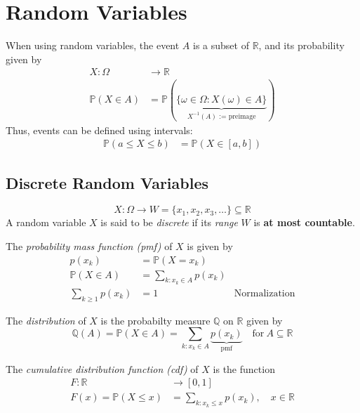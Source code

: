 \section{Random Variables}
When using random variables, the event $A$ is a subset of $\mathbb{R}$, and its probability given by
\noindent\begin{align*}
    X : \Omega         & \rightarrow \mathbb{R}                                                                      \\
    \mathbb{P}(X\in A) & =\mathbb{P}(\underbrace{\{\omega\in\Omega:X(\omega)\in A\}}_{X^{-1}(A)\text{ := preimage}})
\end{align*}
Thus, events can be defined using intervals:
\noindent\begin{align*}
    \mathbb{P}(a\leq X\leq b) & =\mathbb{P}(X\in[a,b])
\end{align*}

\subsection{Discrete Random Variables}
\noindent\begin{equation*}
    X:\Omega\rightarrow W=\{x_1,x_2,x_3,\ldots\}\subseteq\mathbb{R}
\end{equation*}
A random variable $X$ is said to be \textit{discrete} if its \textit{range} $W$ is \textbf{at most countable}.
\newpar{}

The \textit{probability mass function (pmf)} of $X$ is given by
\noindent\begin{align*}
    p(x_{k})            & =\mathbb{P}(X=x_{k})                            \\
    \mathbb{P}(X\in A)  & =\sum_{k:x_k\in A}p(x_k)                        \\
    \sum_{k\geq1}p(x_k) & =1                       & \text{Normalization}
\end{align*}

\newpar{}

The \textit{distribution} of $X$ is the probabilty measure $\mathbb{Q}$ on $\mathbb{R}$ given by
\noindent\begin{equation*}
    \mathbb{Q}(A)=\mathbb{P}(X\in A)=\sum_{k:x_k\in A} \underbrace{p(x_k)}_{\text{pmf}}\quad\mathrm{for~}A\subseteq\mathbb{R}
\end{equation*}

\newpar{}

The \textit{cumulative distribution function (cdf)} of $X$ is the function
\noindent\begin{align*}
    F:\mathbb{R}            & \rightarrow [0,1]                             \\
    F(x)=\mathbb P(X\leq x) & =\sum_{k:x_k\leq x}p(x_k),\quad x\in\mathbb R
\end{align*}

